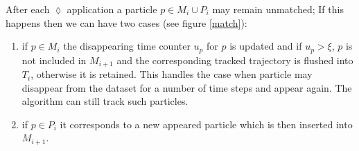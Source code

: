 \documentclass[conference]{IEEEtran}
\begin{document}
After each $\lozenge$ application a particle $p \in {M_i} \cup P_i $ may remain  unmatched; If this happens then we can have two cases (see figure \ref{match}):
\begin{enumerate}
 \item if $p \in M_{i}$ the disappearing time counter $u_p$ for $p$ is updated and if $u_p > \xi$, $p$ is not included in $M_{i+1}$ and the corresponding tracked trajectory is flushed into $T_i$, otherwise it is retained. This handles the case when particle may disappear from the dataset for a number of time steps and  appear again. The algorithm can still track such particles.
 \item if $p \in P_i$ it corresponds to a new appeared particle which is then inserted into $M_{i+1}$. 
\end{enumerate}
 
\end{document}
